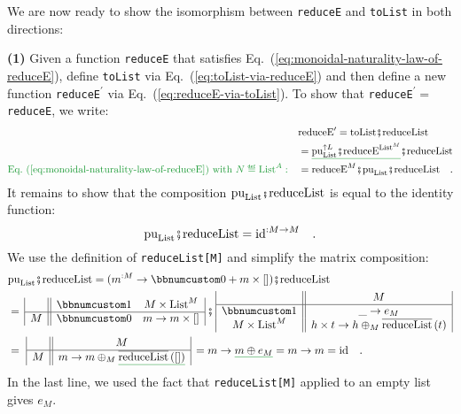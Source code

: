 We are now ready to show the isomorphism between \lstinline!reduceE!
and \lstinline!toList! in both directions:

\textbf{(1)} Given a function \lstinline!reduceE! that satisfies
Eq.~(\ref{eq:monoidal-naturality-law-of-reduceE}), define \lstinline!toList!
via Eq.~(\ref{eq:toList-via-reduceE}) and then define a new function
\lstinline!reduceE!$^{\prime}$ via Eq.~(\ref{eq:reduceE-via-toList}).
To show that \lstinline!reduceE!$^{\prime}=$ \lstinline!reduceE!,
we write:
\begin{align*}
 & \text{reduceE}^{\prime}=\text{toList}\bef\text{reduceList}\\
 & =\gunderline{\text{pu}_{\text{List}}^{\uparrow L}\bef\text{reduceE}^{\text{List}^{M}}}\bef\text{reduceList}\\
{\color{greenunder}\text{Eq.~(\ref{eq:monoidal-naturality-law-of-reduceE}) with }N\triangleq\text{List}^{A}:}\quad & =\text{reduceE}^{M}\bef\text{pu}_{\text{List}}\bef\text{reduceList}\quad.
\end{align*}
It remains to show that the composition $\text{pu}_{\text{List}}\bef\text{reduceList}$
is equal to the identity function:
\[
\text{pu}_{\text{List}}\bef\text{reduceList}=\text{id}^{:M\rightarrow M}\quad.
\]
We use the definition of \lstinline!reduceList[M]! and simplify the
matrix composition:
\begin{align*}
 & \text{pu}_{\text{List}}\bef\text{reduceList}=(m^{:M}\rightarrow\bbnum 0+m\times\left[\right])\bef\text{reduceList}\\
 & =\,\begin{array}{|c||cc|}
 & \bbnum 1 & M\times\text{List}^{M}\\
\hline M & \bbnum 0 & m\rightarrow m\times\left[\right]
\end{array}\,\bef\,\begin{array}{|c||c|}
 & M\\
\hline \bbnum 1 & \_\rightarrow e_{M}\\
M\times\text{List}^{M} & h\times t\rightarrow h\oplus_{M}\overline{\text{reduceList}}\left(t\right)
\end{array}\\
 & =\,\,\begin{array}{|c||c|}
 & M\\
\hline M & m\rightarrow m\oplus_{M}\gunderline{\overline{\text{reduceList}}\left(\left[\right]\right)}
\end{array}\,=m\rightarrow\gunderline{m\oplus e_{M}}=m\rightarrow m=\text{id}\quad.
\end{align*}
In the last line, we used the fact that \lstinline!reduceList[M]!
applied to an empty list gives $e_{M}$.

